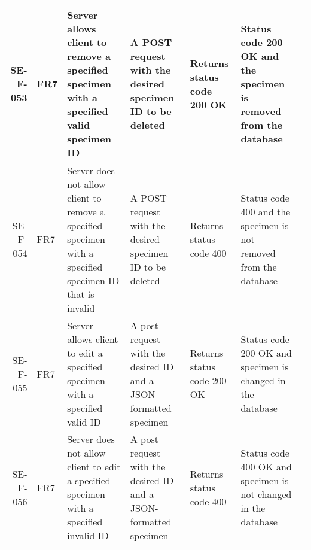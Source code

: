 \begin{landscape}
\begin{longtable}{|r|l|p{4cm}|p{4cm}|p{4cm}|p{4cm}|l|}
		SE-F-053 & FR7 & Server allows client to remove a specified specimen with a specified valid specimen ID &  A POST request with the desired specimen ID to be deleted &  Returns status code 200 OK &  Status code 200 OK and the specimen is removed from the database & \\ \hline
		SE-F-054 & FR7 & Server does not allow client to remove a specified specimen with a specified specimen ID that is invalid&  A POST request with the desired specimen ID to be deleted &  Returns status code 400 &  Status code 400 and the specimen is not removed from the database & \\ \hline
		SE-F-055 & FR7 & Server allows client to edit a specified specimen with a specified valid ID & A post request with the desired ID and a JSON-formatted specimen & Returns status code 200 OK  & Status code 200 OK and specimen is changed in the database & \\ \hline
		SE-F-056 & FR7 & Server does not allow client to edit a specified specimen with a specified invalid ID & A post request with the desired ID and a JSON-formatted specimen & Returns status code 400  & Status code 400 OK and specimen is not changed in the database & \\ \hline
		\end{longtable}
	\end{landscape}
